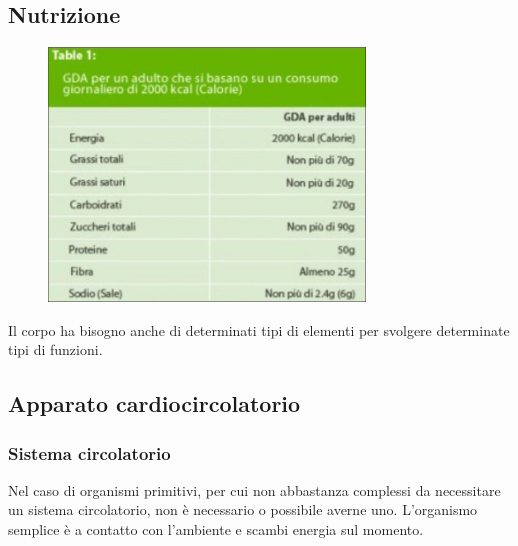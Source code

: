 \documentclass[a4paper]{article}
\begin{document}
\pagebreak

\subsection{Nutrizione}

\begin{center}
\begin{figure}[th]
    \centering
    \includegraphics[width=0.75\textwidth]{./daily_intake.png}
\end{figure}
\end{center}

Il corpo ha bisogno anche di determinati tipi di elementi per svolgere determinate tipi di funzioni.


\pagebreak

\subsection{Apparato cardiocircolatorio}

\subsubsection{Sistema circolatorio}


Nel caso di organismi primitivi, per cui non abbastanza complessi da necessitare un sistema circolatorio,
non è necessario o possibile averne uno.
L'organismo semplice è a contatto con l'ambiente e scambi energia sul momento.
\end{document}
